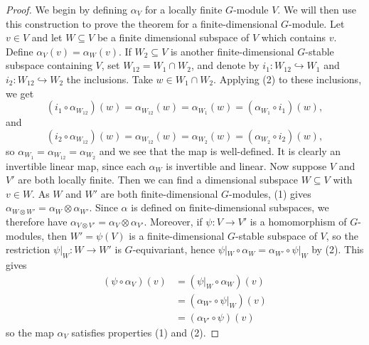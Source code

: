 \documentclass[10pt]{amsart}
\numberwithin{equation}{section}
\newcommand{\mono}{\hookrightarrow}
\theoremstyle{plain}
\theoremstyle{definition}
\theoremstyle{remark}
\begin{document}
\begin{proof}
We begin by defining $\alpha_V$ for a locally finite $G$-module $V$. We will then use this construction to prove the theorem for a finite-dimensional $G$-module. Let $v \in V$ and let $W \subseteq V$ be a finite dimensional subspace of $V$ which contains $v$. Define $\alpha_V(v) = \alpha_W(v)$. If $W_2 \subseteq V$ is another finite-dimensional $G$-stable subspace containing $V$, set $W_{12} = W_1 \cap W_2$, and denote by $i_1: W_{12} \mono W_1$ and $i_2: W_{12} \mono W_2$ the inclusions. Take $w \in W_1 \cap W_2$. Applying (2) to these inclusions, we get 
\[\left(i_1 \circ \alpha_{W_{12}}\right)(w) = \alpha_{W_{12}}(w) = \alpha_{W_1}(w) = (\alpha_{W_1} \circ i_1)(w),\]
and
\[\left(i_2 \circ \alpha_{W_{12}}\right)(w) = \alpha_{W_{12}}(w) = \alpha_{W_2}(w) = (\alpha_{W_2} \circ i_2)(w),\]
so $\alpha_{W_1} = \alpha_{W_{12}} = \alpha_{W_2}$ and we see that the map is well-defined. It is clearly an invertible linear map, since each $\alpha_W$ is invertible and linear. Now suppose $V$ and $V'$ are both locally finite. Then we can find a dimensional subspace $W \subseteq V$ with $v \in W$. As $W$ and $W'$ are both finite-dimensional $G$-modules, (1) gives $\alpha_{W \otimes W'} = \alpha_W \otimes \alpha_{W'}$. Since $\alpha$ is defined on finite-dimensional subspaces, we therefore have $\alpha_{V \otimes V'} = \alpha_V \otimes \alpha_{V'}$.  Moreover, if $\psi: V \to V'$ is a homomorphism of $G$-modules, then $W' = \psi(V)$ is a finite-dimensional $G$-stable subspace of $V$, so the restriction $\psi|
_{W}: W \to W'$ is $G$-equivariant, hence $\psi|_{W} \circ \alpha_W = \alpha_{W'} \circ \psi|_W$ by (2). This gives 
\begin{align*}
    \left(\psi \circ \alpha_V\right)(v) &=  \left(\psi|_{W} \circ \alpha_W \right)(v)\\ 
                                     &= (\alpha_{W'}\circ \psi|_W)(v)\\
                                     &= \left(\alpha_{V'} \circ \psi\right)(v)
\end{align*}
so the map $\alpha_V$ satisfies properties (1) and (2).


\end{proof}
\end{document}
